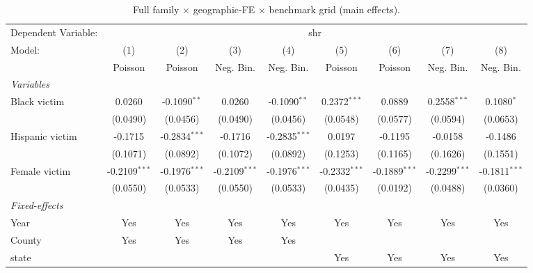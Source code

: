
\begin{table}[htbp]
   \caption{\label{tab:grid} Full family $\times$ geographic-FE $\times$ benchmark grid (main effects).}
   \centering
   \begin{tabular}{lcccccccc}
      \tabularnewline \midrule \midrule
      Dependent Variable: & \multicolumn{8}{c}{shr}\\
      Model:          & (1)             & (2)             & (3)             & (4)             & (5)             & (6)             & (7)             & (8)\\  
                      &  Poisson        & Poisson         & Neg. Bin.       & Neg. Bin.       & Poisson         & Poisson         & Neg. Bin.       & Neg. Bin.\\  
      \midrule
      \emph{Variables}\\
      Black victim    & 0.0260          & -0.1090$^{**}$  & 0.0260          & -0.1090$^{**}$  & 0.2372$^{***}$  & 0.0889          & 0.2558$^{***}$  & 0.1080$^{*}$\\   
                      & (0.0490)        & (0.0456)        & (0.0490)        & (0.0456)        & (0.0548)        & (0.0577)        & (0.0594)        & (0.0653)\\   
      Hispanic victim & -0.1715         & -0.2834$^{***}$ & -0.1716         & -0.2835$^{***}$ & 0.0197          & -0.1195         & -0.0158         & -0.1486\\   
                      & (0.1071)        & (0.0892)        & (0.1072)        & (0.0892)        & (0.1253)        & (0.1165)        & (0.1626)        & (0.1551)\\   
      Female victim   & -0.2109$^{***}$ & -0.1976$^{***}$ & -0.2109$^{***}$ & -0.1976$^{***}$ & -0.2332$^{***}$ & -0.1889$^{***}$ & -0.2299$^{***}$ & -0.1811$^{***}$\\   
                      & (0.0550)        & (0.0533)        & (0.0550)        & (0.0533)        & (0.0435)        & (0.0192)        & (0.0488)        & (0.0360)\\   
      \midrule
      \emph{Fixed-effects}\\
      Year            & Yes             & Yes             & Yes             & Yes             & Yes             & Yes             & Yes             & Yes\\  
      County          & Yes             & Yes             & Yes             & Yes             &                 &                 &                 & \\  
      state           &                 &                 &                 &                 & Yes             & Yes             & Yes             & Yes\\  

\end{tabular}
\end{table}
